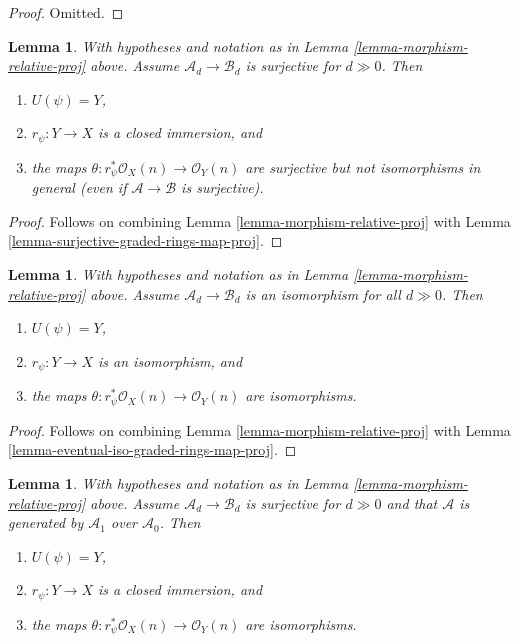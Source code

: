 \documentclass{stacks-project}
\theoremstyle{plain}
\newtheorem{lemma}[subsection]{Lemma}
\theoremstyle{definition}
\theoremstyle{remark}
\numberwithin{equation}{subsection}
\begin{document}
\begin{proof}
Omitted.
\end{proof}

\begin{lemma}
\label{lemma-surjective-graded-rings-map-relative-proj}
With hypotheses and notation as in Lemma \ref{lemma-morphism-relative-proj}
above. Assume $\mathcal{A}_d \to \mathcal{B}_d$ is surjective for
$d \gg 0$. Then
\begin{enumerate}
\item $U(\psi) = Y$,
\item $r_\psi : Y \to X$ is a closed immersion, and
\item the maps $\theta : r_\psi^*\mathcal{O}_X(n) \to \mathcal{O}_Y(n)$
are surjective but not isomorphisms in general (even if
$\mathcal{A} \to \mathcal{B}$ is surjective).
\end{enumerate}
\end{lemma}

\begin{proof}
Follows on combining
Lemma \ref{lemma-morphism-relative-proj}
with
Lemma \ref{lemma-surjective-graded-rings-map-proj}.
\end{proof}

\begin{lemma}
\label{lemma-eventual-iso-graded-rings-map-relative-proj}
With hypotheses and notation as in Lemma \ref{lemma-morphism-relative-proj}
above. Assume $\mathcal{A}_d \to \mathcal{B}_d$ is an isomorphism for all
$d \gg 0$. Then
\begin{enumerate}
\item $U(\psi) = Y$,
\item $r_\psi : Y \to X$ is an isomorphism, and
\item the maps $\theta : r_\psi^*\mathcal{O}_X(n) \to \mathcal{O}_Y(n)$
are isomorphisms.
\end{enumerate}
\end{lemma}

\begin{proof}
Follows on combining
Lemma \ref{lemma-morphism-relative-proj}
with
Lemma \ref{lemma-eventual-iso-graded-rings-map-proj}.
\end{proof}

\begin{lemma}
\label{lemma-surjective-generated-degree-1-map-relative-proj}
With hypotheses and notation as in Lemma \ref{lemma-morphism-relative-proj}
above. Assume $\mathcal{A}_d \to \mathcal{B}_d$ is surjective for $d \gg 0$
and that $\mathcal{A}$ is generated by $\mathcal{A}_1$ over $\mathcal{A}_0$.
Then
\begin{enumerate}
\item $U(\psi) = Y$,
\item $r_\psi : Y \to X$ is a closed immersion, and
\item the maps $\theta : r_\psi^*\mathcal{O}_X(n) \to \mathcal{O}_Y(n)$
are isomorphisms.
\end{enumerate}
\end{lemma}
\end{document}
